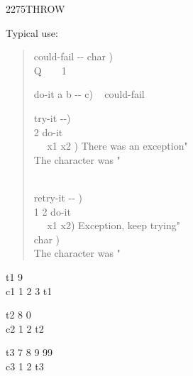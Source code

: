 \begin{worddef}{2275}{THROW}
\begin{rationale}
		Typical use:
		\begin{quote}\ttfamily
			\word{:} could-fail  -{}- char ) \\
			\tab {}  \word{[CHAR]} Q \word{=}~
				~ 1 
			\word{;}

			\word{:} do-it  a b -{}- c) ~
				 could-fail \word{;}

			\word{:} try-it  -{}-) \\
			 2 \word{[']} do-it~ ~  \\
			\tab~~  x1 x2 ) 
				  There was an exception"  \\
			\tab {}
				 The character was "   \\
			\tab {} \\
			\word{;}

			\word{;} retry-it  -{}- ) \\
			\tab {}  1 2 \word{[']} do-it ~
				 \\
			\tab~~  x1 x2) 
				 Exception, keep trying"  \\
			\tab {}  char ) \\
			\tab {} The character was "   \\
			\word{;}
		\end{quote}
	\end{rationale}

	\begin{testing} \ttfamily

		\word{:} t1 9 \word{;} \\
		\word{:} c1 1 2 3 \word{[']} t1  \word{;} \\
		 \tab {} 

		\word{:} t2 8 0  \word{;} \\
		\word{:} c2 1 2 \word{[']} t2  \word{;}
		 \tab {} 

		\word{:} t3 7 8 9 99  \word{;} \\
		\word{:} c3 1 2 \word{[']} t3  \word{;}\\
		 \tab {} 


\end{testing}
\end{worddef}

